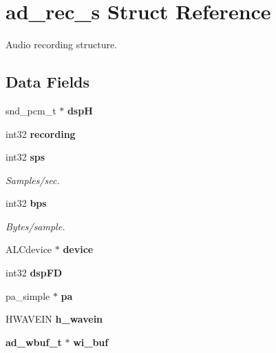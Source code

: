 \section{ad\-\_\-rec\-\_\-s Struct Reference}
\label{structad__rec__s}


Audio recording structure.  


\subsection*{Data Fields}
\begin{DoxyCompactItemize}
\item 
snd\-\_\-pcm\-\_\-t $\ast$ {\bfseries dsp\-H}\label{structad__rec__s_af4b2cd7de40e5b2a48d2d6878d33cc18}

\item 
int32 {\bfseries recording}\label{structad__rec__s_a5ddf90deb3806752a1fa3152fe864047}

\item 
int32 {\bf sps}\label{structad__rec__s_a2c5120af44acf19c5c7c63778bc932a3}

\begin{DoxyCompactList}\small\item\em Samples/sec. \end{DoxyCompactList}\item 
int32 {\bf bps}\label{structad__rec__s_a731523ef22607a580877bdcc563d9e5e}

\begin{DoxyCompactList}\small\item\em Bytes/sample. \end{DoxyCompactList}\item 
A\-L\-Cdevice $\ast$ {\bfseries device}\label{structad__rec__s_a3e4378783effb06051461aca5a3d2f6c}

\item 
int32 {\bfseries dsp\-F\-D}\label{structad__rec__s_a7bd3eea2ed7b7be7155d4304505b140e}

\item 
pa\-\_\-simple $\ast$ {\bfseries pa}\label{structad__rec__s_a8ebda5d453f68928e21548739f27ceb9}

\item 
H\-W\-A\-V\-E\-I\-N {\bfseries h\-\_\-wavein}\label{structad__rec__s_a79081fc333f54eff7afdc23404f3ae69}

\item 
{\bf ad\-\_\-wbuf\-\_\-t} $\ast$ {\bfseries wi\-\_\-buf}\label{structad__rec__s_a81d0d2d45fe558b7e7c5504680b15dc5}


\end{DoxyCompactItemize}
